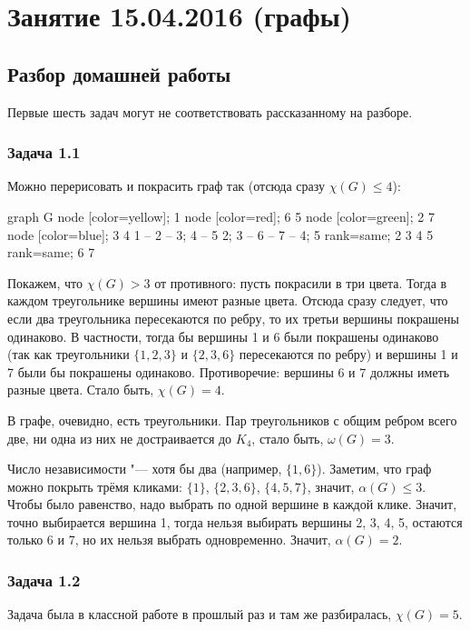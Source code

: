 \chapter{Занятие 15.04.2016 (графы)}

\section{Разбор домашней работы}
	Первые шесть задач могут не соответствовать рассказанному на разборе.

\subsection{Задача 1.1}
	Можно перерисовать и покрасить граф так (отсюда сразу $\chi(G) \le 4$):
	\begin{center}
		\begin{dot2tex}[scale=0.8,options=-tmath]
			graph G {
				node [color=yellow]; 1
				node [color=red]; 6 5
				node [color=green]; 2 7
				node [color=blue]; 3 4
				1 -- {2 -- 3; 4 -- 5}
				{2; 3} -- 6 -- 7 -- {4; 5}
				{ rank=same; 2 3 4 5 }
				{ rank=same; 6 7 }
			}
		\end{dot2tex}
	\end{center}
	Покажем, что $\chi(G) > 3$ от противного: пусть покрасили в три цвета.
	Тогда в каждом треугольнике вершины имеют разные цвета.
	Отсюда сразу следует, что если два треугольника пересекаются по ребру,
	то их третьи вершины покрашены одинаково.
	В частности, тогда бы вершины 1 и 6 были покрашены одинаково (так как треугольники $\{1,2,3\}$
	и $\{2,3,6\}$ пересекаются по ребру) и вершины 1 и 7 были бы покрашены одинаково.
	Противоречие: вершины 6 и 7 должны иметь разные цвета.
	Стало быть, $\chi(G) = 4$.

	В графе, очевидно, есть треугольники.
	Пар треугольников с общим ребром всего две, ни одна из них не достраивается до $K_4$,
	стало быть, $\omega(G)=3$.

	Число независимости "--- хотя бы два (например, $\{1, 6\}$).
	Заметим, что граф можно покрыть трёмя кликами: $\{1\}$, $\{2,3,6\}$, $\{4,5,7\}$,
	значит, $\alpha(G) \le 3$.
	Чтобы было равенство, надо выбрать по одной вершине в каждой клике.
	Значит, точно выбирается вершина 1, тогда нельзя выбирать вершины 2, 3, 4, 5, остаются только
	6 и 7, но их нельзя выбрать одновременно.
	Значит, $\alpha(G)=2$.

\subsection{Задача 1.2}
	Задача была в классной работе в прошлый раз и там же разбиралась, $\chi(G)=5$.

